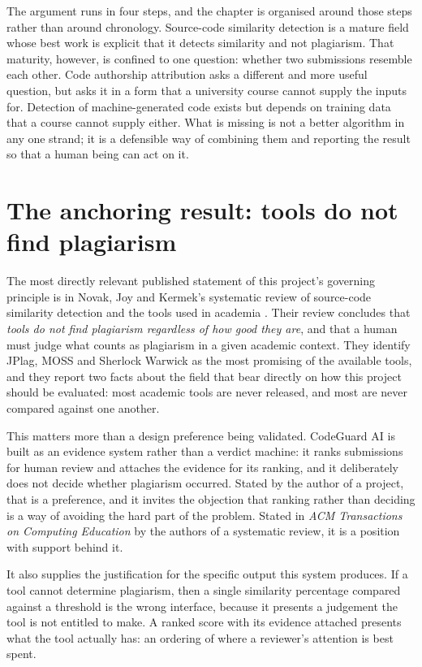 The argument runs in four steps, and the chapter is organised around
those steps rather than around chronology. Source-code similarity
detection is a mature field whose best work is explicit that it detects
similarity and not plagiarism. That maturity, however, is confined to
one question: whether two submissions resemble each other. Code
authorship attribution asks a different and more useful question, but
asks it in a form that a university course cannot supply the inputs for.
Detection of machine-generated code exists but depends on training data
that a course cannot supply either. What is missing is not a better
algorithm in any one strand; it is a defensible way of combining them
and reporting the result so that a human being can act on it.

\hypertarget{the-anchoring-result-tools-do-not-find-plagiarism}{%
\section{The anchoring result: tools do not find
plagiarism}\label{the-anchoring-result-tools-do-not-find-plagiarism}}

The most directly relevant published statement of this project's
governing principle is in Novak, Joy and Kermek's systematic review of
source-code similarity detection and the tools used in academia
\cite{novak2019}. Their review concludes that \emph{tools do not find
plagiarism regardless of how good they are}, and that a human must judge
what counts as plagiarism in a given academic context. They identify
JPlag, MOSS and Sherlock Warwick as the most promising of the available
tools, and they report two facts about the field that bear directly on
how this project should be evaluated: most academic tools are never
released, and most are never compared against one another.

This matters more than a design preference being validated. CodeGuard AI
is built as an evidence system rather than a verdict machine: it ranks
submissions for human review and attaches the evidence for its ranking,
and it deliberately does not decide whether plagiarism occurred. Stated
by the author of a project, that is a preference, and it invites the
objection that ranking rather than deciding is a way of avoiding the
hard part of the problem. Stated in \emph{ACM Transactions on Computing
Education} by the authors of a systematic review, it is a position with
support behind it.

It also supplies the justification for the specific output this system
produces. If a tool cannot determine plagiarism, then a single
similarity percentage compared against a threshold is the wrong
interface, because it presents a judgement the tool is not entitled to
make. A ranked score with its evidence attached presents what the tool
actually has: an ordering of where a reviewer's attention is best spent.

